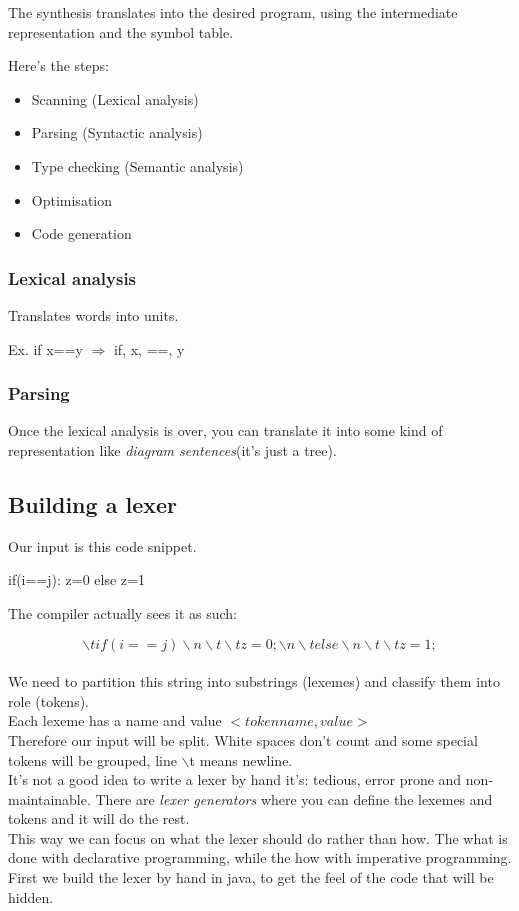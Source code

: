 \documentclass[12pt]{article}
\begin{document}
The synthesis translates into the desired program, using the intermediate representation and the symbol table.  

Here's the steps:
\begin{itemize}
    \item Scanning (Lexical analysis)
    \item Parsing (Syntactic analysis)
    \item Type checking (Semantic analysis)
    \item Optimisation
    \item Code generation
\end{itemize}

\subsubsection{Lexical analysis}
Translates words into units. 

Ex. if x==y $\Rightarrow$ if, x, ==, y

\subsubsection{Parsing}
Once the lexical analysis is over, you can translate it into some kind of representation like \emph{diagram sentences}(it's just a tree).

\subsection{Building a lexer} 
Our input is this code snippet.
\begin{mycode}[]
    if(i==j): 
        z=0
    else 
        z=1
\end{mycode}
The compiler actually sees it as such:

\[\backslash tif (i == j)\backslash n\backslash t\backslash tz = 0;\backslash n\backslash telse\backslash n\backslash t\backslash tz = 1;\]
\\
We need to partition this string into substrings (lexemes) and classify them into role (tokens).
\\ 
Each lexeme has a name and value $<token name, value>$
\\
Therefore our input will be split. White spaces don't count and some special tokens will be grouped, line $\backslash$t means newline. 
\\ 
It's not a good idea to write a lexer by hand it's: tedious, error prone and non-maintainable. There are \emph{lexer generators} where you can define the lexemes and tokens and it will do the rest.
\\ 
This way we can focus on what the lexer should do rather than how. The what is done with declarative programming, while the how with imperative programming.
\\ 
First we build the lexer by hand in java, to get the feel of the code that will be hidden. 
\end{document}
